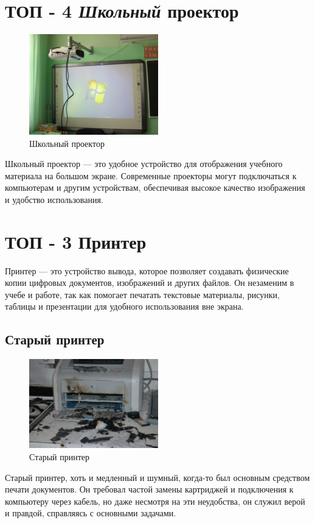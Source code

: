 \documentclass[14pt]{extreport}
\begin{document}
    \section{ТОП - 4 \textit{Школьный} проектор}
    \begin{figure}[h]
        \centering
        \includegraphics[width=0.5\textwidth]{proektor.png}
        \caption{Школьный проектор}
        \label{fig:example1}
    \end{figure}
    Школьный проектор — это удобное устройство для отображения учебного материала на большом экране. Современные проекторы могут подключаться к компьютерам и другим устройствам, обеспечивая высокое качество изображения и удобство использования.
    
    \section{ТОП - 3 Принтер}
    Принтер — это устройство вывода, которое позволяет создавать физические копии цифровых документов, изображений и других файлов.  Он незаменим в учебе и работе, так как помогает печатать текстовые материалы, рисунки, таблицы и презентации для удобного использования вне экрана.

    \subsection{Старый принтер}
    \begin{figure}[h]
        \centering
        \includegraphics[width=0.5\textwidth]{printer.png}
        \caption{Старый принтер}
        \label{fig:example1}
    \end{figure}
    Старый принтер, хоть и медленный и шумный, когда-то был основным средством печати документов. Он требовал частой замены картриджей и подключения к компьютеру через кабель, но даже несмотря на эти неудобства, он служил верой и правдой, справляясь с основными задачами.
\end{document}
